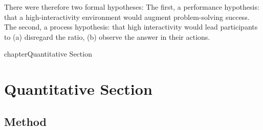 There were therefore two formal hypotheses: The first, a performance hypothesis: that a high-interactivity environment would augment problem-solving success. The second, a process hypothesis: that high interactivity would lead participants to (a) disregard the ratio, (b) observe the answer in their actions.


chapter{Quantitative Section}
\chapter{Quantitative Section}


\section{Method}


